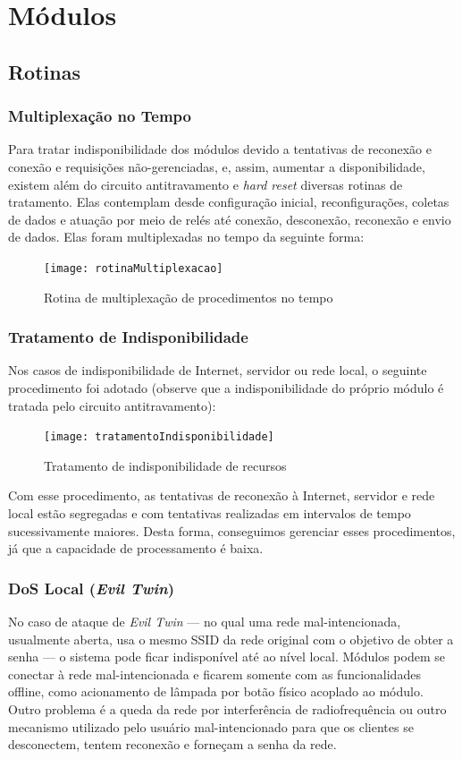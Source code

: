 \section{Módulos}
\subsection {Rotinas}
\subsubsection{Multiplexação no Tempo}
Para tratar indisponibilidade dos módulos devido a tentativas de reconexão e conexão e requisições não-gerenciadas, e, assim, aumentar a disponibilidade, existem além do circuito antitravamento e \textit{hard reset} diversas rotinas de tratamento. Elas contemplam desde configuração inicial, reconfigurações, coletas de dados e atuação por meio de relés até conexão, desconexão, reconexão e envio de dados. Elas foram multiplexadas no tempo da seguinte forma:

\begin{figure} [H]
	\centering
	\caption{Rotina de multiplexação de procedimentos no tempo}
  \texttt{[image: rotinaMultiplexacao]}
\label{fig:rotinaMultiplexacao}
\end{figure}

\subsubsection{Tratamento de Indisponibilidade}
Nos casos de indisponibilidade de Internet, servidor ou rede local, o seguinte procedimento foi adotado (observe que a indisponibilidade do próprio módulo é tratada pelo circuito antitravamento):

\begin{figure}[H]
	\centering
	\caption{Tratamento de indisponibilidade de recursos}
  \texttt{[image: tratamentoIndisponibilidade]}
\label{fig:tratamentoIndisponibilidade}
\end{figure}

Com esse procedimento, as tentativas de reconexão à Internet, servidor e rede local estão segregadas e com tentativas realizadas em intervalos de tempo sucessivamente maiores. Desta forma, conseguimos gerenciar esses procedimentos, já que a capacidade de processamento é baixa.

\subsubsection{DoS Local (\textit{Evil Twin})}
No caso de ataque de \textit{Evil Twin} --- no qual uma rede mal-intencionada, usualmente aberta, usa o mesmo SSID da rede original com o objetivo de obter a senha --- o sistema pode ficar indisponível até ao nível local. Módulos podem se conectar à rede mal-intencionada e ficarem somente com as funcionalidades offline, como acionamento de lâmpada por botão físico acoplado ao módulo. Outro problema é a queda da rede por interferência de radiofrequência ou outro mecanismo utilizado pelo usuário mal-intencionado para que os clientes se desconectem, tentem reconexão e forneçam a senha da rede.

